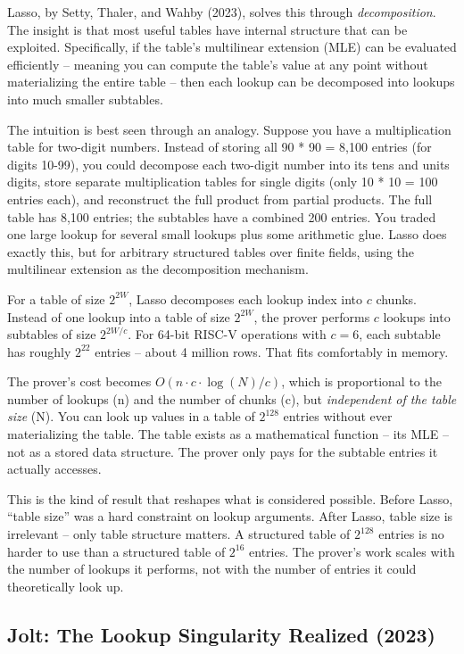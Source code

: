 \documentclass[
  11pt,
  openany]{report}
\begin{document}
Lasso, by Setty, Thaler, and Wahby (2023), solves this through
\emph{decomposition}. The insight is that most useful tables have internal
structure that can be exploited. Specifically, if the table's multilinear
extension (MLE) can be evaluated efficiently -- meaning you can compute the
table's value at any point without materializing the entire table -- then each
lookup can be decomposed into lookups into much smaller subtables.

The intuition is best seen through an analogy. Suppose you have a multiplication
table for two-digit numbers. Instead of storing all 90 * 90 = 8,100 entries (for
digits 10-99), you could decompose each two-digit number into its tens and units
digits, store separate multiplication tables for single digits (only 10 * 10 =
100 entries each), and reconstruct the full product from partial products. The
full table has 8,100 entries; the subtables have a combined 200 entries. You
traded one large lookup for several small lookups plus some arithmetic glue.
Lasso does exactly this, but for arbitrary structured tables over finite fields,
using the multilinear extension as the decomposition mechanism.

For a table of size \(2^{2W}\), Lasso decomposes each lookup index into \(c\)
chunks. Instead of one lookup into a table of size \(2^{2W}\), the prover
performs \(c\) lookups into subtables of size \(2^{2W/c}\). For 64-bit RISC-V
operations with \(c = 6\), each subtable has roughly \(2^{22}\) entries -- about
4 million rows. That fits comfortably in memory.

The prover's cost becomes \(O(n \cdot c \cdot \log(N)/c)\), which is
proportional to the number of lookups (n) and the number of chunks (c), but
\emph{independent of the table size} (N). You can look up values in a table of
\(2^{128}\) entries without ever materializing the table. The table exists as a
mathematical function -- its MLE -- not as a stored data structure. The prover
only pays for the subtable entries it actually accesses.

This is the kind of result that reshapes what is considered possible. Before
Lasso, ``table size'' was a hard constraint on lookup arguments. After Lasso,
table size is irrelevant -- only table structure matters. A structured table of
\(2^{128}\) entries is no harder to use than a structured table of \(2^{16}\)
entries. The prover's work scales with the number of lookups it performs, not
with the number of entries it could theoretically look up.

\subsection{Jolt: The Lookup Singularity Realized
(2023)}\label{jolt-the-lookup-singularity-realized-2023}
\end{document}
